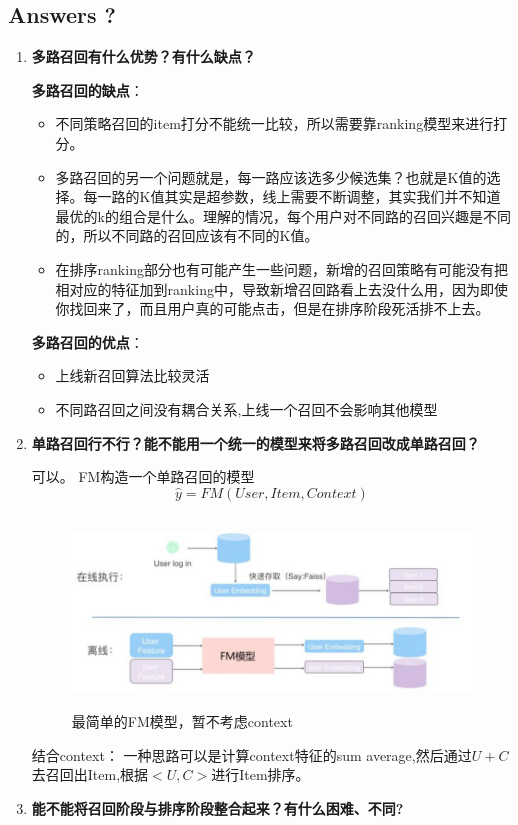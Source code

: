 \documentclass{article}
\begin{document}
\begin{CJK*}{UTF8}{gbsn}
\section{Answers ?}
\begin{enumerate}

\item \textbf{多路召回有什么优势？有什么缺点？}

\textbf{多路召回的缺点}：
\begin{itemize}
\item 不同策略召回的item打分不能统一比较，所以需要靠ranking模型来进行打分。
\item 多路召回的另一个问题就是，每一路应该选多少候选集？也就是K值的选择。每一路的K值其实是超参数，线上需要不断调整，其实我们并不知道最优的k的组合是什么。理解的情况，每个用户对不同路的召回兴趣是不同的，所以不同路的召回应该有不同的K值。
\item 在排序ranking部分也有可能产生一些问题，新增的召回策略有可能没有把相对应的特征加到ranking中，导致新增召回路看上去没什么用，因为即使你找回来了，而且用户真的可能点击，但是在排序阶段死活排不上去。
\end{itemize}

\textbf{多路召回的优点}：
\begin{itemize}
\item 上线新召回算法比较灵活
\item 不同路召回之间没有耦合关系,上线一个召回不会影响其他模型
\end{itemize}

\item \textbf{单路召回行不行？能不能用一个统一的模型来将多路召回改成单路召回？}

可以。 FM构造一个单路召回的模型
$$\widehat{y}=FM(User,Item,Context)$$

\begin{figure}[H]
\centering
\includegraphics[width=4.8in,height=2in]{fm1}
\caption{最简单的FM模型，暂不考虑context}
\end{figure}
结合context： 一种思路可以是计算context特征的sum average,然后通过$U+C$去召回出Item,根据$<U,C>$进行Item排序。
\item \textbf{能不能将召回阶段与排序阶段整合起来？有什么困难、不同?}


\end{enumerate}
\end{CJK*}
\end{document}
